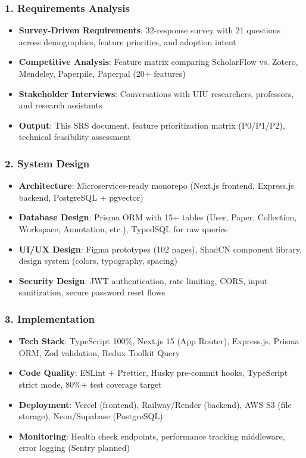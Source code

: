 \subsubsection{1. Requirements Analysis}

\begin{itemize}
    \item \textbf{Survey-Driven Requirements}: 32-response survey with 21 questions across demographics, feature priorities, and adoption intent
    \item \textbf{Competitive Analysis}: Feature matrix comparing ScholarFlow vs. Zotero, Mendeley, Paperpile, Paperpal (20+ features)
    \item \textbf{Stakeholder Interviews}: Conversations with UIU researchers, professors, and research assistants
    \item \textbf{Output}: This SRS document, feature prioritization matrix (P0/P1/P2), technical feasibility assessment
\end{itemize}

\subsubsection{2. System Design}

\begin{itemize}
    \item \textbf{Architecture}: Microservices-ready monorepo (Next.js frontend, Express.js backend, PostgreSQL + pgvector)
    \item \textbf{Database Design}: Prisma ORM with 15+ tables (User, Paper, Collection, Workspace, Annotation, etc.), TypedSQL for raw queries
    \item \textbf{UI/UX Design}: Figma prototypes (102 pages), ShadCN component library, design system (colors, typography, spacing)
    \item \textbf{Security Design}: JWT authentication, rate limiting, CORS, input sanitization, secure password reset flows
\end{itemize}

\subsubsection{3. Implementation}

\begin{itemize}
    \item \textbf{Tech Stack}: TypeScript 100\%, Next.js 15 (App Router), Express.js, Prisma ORM, Zod validation, Redux Toolkit Query
    \item \textbf{Code Quality}: ESLint + Prettier, Husky pre-commit hooks, TypeScript strict mode, 80\%+ test coverage target
    \item \textbf{Deployment}: Vercel (frontend), Railway/Render (backend), AWS S3 (file storage), Neon/Supabase (PostgreSQL)
    \item \textbf{Monitoring}: Health check endpoints, performance tracking middleware, error logging (Sentry planned)
\end{itemize}

